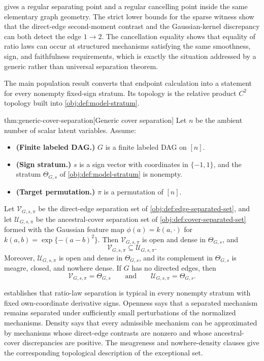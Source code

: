  gives a regular separating point and a regular cancelling point inside the same elementary graph geometry. The strict lower bounds for the sparse witness show that the direct-edge second-moment contrast and the Gaussian-kernel discrepancy can both detect the edge \(1\to2\). The cancellation equality shows that equality of ratio laws can occur at structured mechanisms satisfying the same smoothness, sign, and faithfulness requirements, which is exactly the situation addressed by a generic rather than universal separation theorem.

The main population result converts that endpoint calculation into a statement for every nonempty fixed-sign stratum. Its topology is the relative product \(C^2\) topology built into \cref{obj:def:model-stratum}.

\begin{theoremv}{thm:generic-cover-separation}[Generic cover separation]
Let \(n\) be the ambient number of scalar latent variables. Assume:
\begin{itemize}
\item \textbf{(Finite labeled DAG.)} \(G\) is a finite labeled DAG on \([n]\).
\item \textbf{(Sign stratum.)} \(s\) is a sign vector with coordinates in \(\{-1,1\}\), and the stratum \(\Theta_{G,s}\) of \cref{obj:def:model-stratum} is nonempty.
\item \textbf{(Target permutation.)} \(\pi\) is a permutation of \([n]\).
\end{itemize}
Let \(\mathcal V_{G,s,\pi}\) be the direct-edge separation set of \cref{obj:def:edge-separated-set}, and let \(\mathcal U_{G,s,\pi}\) be the ancestral-cover separation set of \cref{obj:def:cover-separated-set} formed with the Gaussian feature map \(\phi(a)=k(a,\cdot)\) for \(k(a,b)=\exp\{-(a-b)^2\}\). Then \(\mathcal V_{G,s,\pi}\) is open and dense in \(\Theta_{G,s}\), and
\[
\mathcal V_{G,s,\pi}\subseteq \mathcal U_{G,s,\pi}.
\]
Moreover, \(\mathcal U_{G,s,\pi}\) is open and dense in \(\Theta_{G,s}\), and its complement in \(\Theta_{G,s}\) is meagre, closed, and nowhere dense. If \(G\) has no directed edges, then
\[
\mathcal V_{G,s,\pi}=\Theta_{G,s}
\qquad\text{and}\qquad
\mathcal U_{G,s,\pi}=\Theta_{G,s}.
\]
\end{theoremv}

 establishes that ratio-law separation is typical in every nonempty stratum with fixed own-coordinate derivative signs. Openness says that a separated mechanism remains separated under sufficiently small perturbations of the normalized mechanisms. Density says that every admissible mechanism can be approximated by mechanisms whose direct-edge contrasts are nonzero and whose ancestral-cover discrepancies are positive. The meagreness and nowhere-density clauses give the corresponding topological description of the exceptional set.

